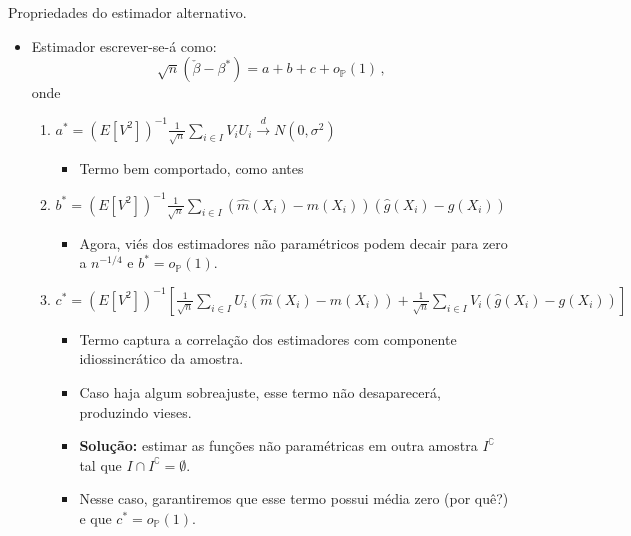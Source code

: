 \documentclass[11pt]{beamer}
\begin{document}
\begin{frame}{Propriedades do estimador alternativo.}
	\begin{itemize}
				\item Estimador escrever-se-á como:
	$$\sqrt{n}(\check{\beta} - \beta^*) =  a+b+c +o_{\mathbb{P}}(1)\, ,$$
	onde 
	\begin{enumerate}
		\item $a^{*}=\left(E\left[V^{2}\right]\right)^{-1} \frac{1}{\sqrt{n}} \sum_{i \in I} V_{i} U_{i} \overset{d}{\to} N(0, \sigma^2)$
		\begin{itemize}
			\item Termo bem comportado, como antes
		\end{itemize}
		\item $b^{*}=\left(E\left[V^{2}\right]\right)^{-1} \frac{1}{\sqrt{n}} \sum_{i \in I}\left(\hat{m}\left(X_{i}\right)-m\left(X_{i}\right)\right)\left(\hat{g}\left(X_{i}\right)-g\left(X_{i}\right)\right)$
		\begin{itemize}
			\item Agora, viés dos estimadores não paramétricos podem decair para zero a $n^{-1/4}$ e $b^* = o_{\mathbb{P}}(1)$.
		\end{itemize}
			\item {\footnotesize$c^{*}=\left(E\left[V^{2}\right]\right)^{-1} \left[\frac{1}{\sqrt{n}} \sum_{i \in I}U_i \left(\hat{m}\left(X_{i}\right)-m\left(X_{i}\right)\right)+ \frac{1}{\sqrt{n}} \sum_{i \in I}V_i\left(\hat{g}\left(X_{i}\right)-g\left(X_{i}\right)\right)\right] $}
			\begin{itemize}
				\item Termo captura a correlação dos estimadores com componente idiossincrático da amostra.
				\item Caso haja algum sobreajuste, esse termo não desaparecerá, produzindo vieses.
				\item \textbf{Solução:} estimar as funções não paramétricas em outra amostra $I^{\complement}$ tal que $I \cap I^{\complement} = \emptyset$.
					\item Nesse caso, garantiremos que esse termo possui média zero (por quê?) e que $c^* = o_{\mathbb{P}}(1)$.
			\end{itemize}
	\end{enumerate}			
\end{itemize}
\end{frame}
\end{document}
